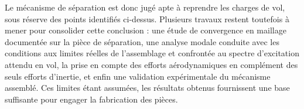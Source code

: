 Le mécanisme de séparation est donc jugé apte à reprendre les charges de vol, sous réserve
des points identifiés ci-dessus. Plusieurs travaux restent toutefois à mener pour consolider
cette conclusion : une étude de convergence en maillage documentée sur la pièce de
séparation, une analyse modale conduite avec les conditions aux limites réelles de
l'assemblage et confrontée au spectre d'excitation attendu en vol, la prise en compte des
efforts aérodynamiques en complément des seuls efforts d'inertie, et enfin une validation
expérimentale du mécanisme assemblé. Ces limites étant assumées, les résultats obtenus
fournissent une base suffisante pour engager la fabrication des pièces.
